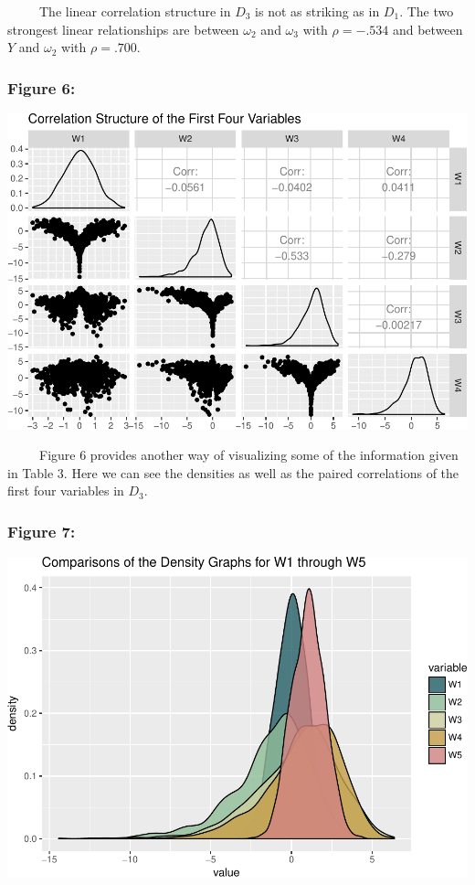 \documentclass[12pt,twoside]{reedthesis}
\begin{document}
  ~~~~~The linear correlation structure in \(D_3\) is not as striking as
  in \(D_1\). The two strongest linear relationships are between
  \(\omega_2\) and \(\omega_3\) with \(\rho = -.534\) and between \(Y\)
  and \(\omega_2\) with \(\rho = .700\).
  
  \subsubsection{Figure 6:}\label{figure-6}
  
  \begin{center}\includegraphics{Thesis_files/figure-latex/fig6-1} \end{center}
  
  ~~~~~Figure 6 provides another way of visualizing some of the
  information given in Table 3. Here we can see the densities as well as
  the paired correlations of the first four variables in \(D_3\).
  
  \subsubsection{Figure 7:}\label{figure-7}
  
  \begin{center}\includegraphics{Thesis_files/figure-latex/fig7-1} \end{center}
  
\end{document}
